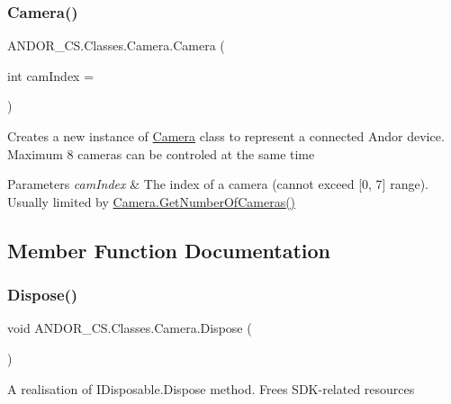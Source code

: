 \subsubsection{\texorpdfstring{Camera()}{Camera()}}
{\footnotesize\ttfamily A\+N\+D\+O\+R\+\_\+\+C\+S.\+Classes.\+Camera.\+Camera (\begin{DoxyParamCaption}\item[{int}]{cam\+Index = {} }\end{DoxyParamCaption})}



Creates a new instance of \hyperlink{class_a_n_d_o_r___c_s_1_1_classes_1_1_camera}{Camera} class to represent a connected Andor device. Maximum 8 cameras can be controled at the same time 


\begin{DoxyParams}{Parameters}
{\em cam\+Index} & The index of a camera (cannot exceed \mbox{[}0, 7\mbox{]} range). Usually limited by \hyperlink{class_a_n_d_o_r___c_s_1_1_classes_1_1_camera_aad5087de881575f5184615caf1fad61a}{Camera.\+Get\+Number\+Of\+Cameras()}\\
\hline
\end{DoxyParams}


\subsection{Member Function Documentation}
\mbox{\label{class_a_n_d_o_r___c_s_1_1_classes_1_1_camera_a0a6c90ea995444043ce9bd37b9fad334}} 
\subsubsection{\texorpdfstring{Dispose()}{Dispose()}}
{\footnotesize\ttfamily void A\+N\+D\+O\+R\+\_\+\+C\+S.\+Classes.\+Camera.\+Dispose (\begin{DoxyParamCaption}{ }\end{DoxyParamCaption})}



A realisation of I\+Disposable.\+Dispose method. Frees S\+D\+K-\/related resources 

\mbox{\label{class_a_n_d_o_r___c_s_1_1_classes_1_1_camera_a678cf1352506a482a68e9285b2f589ec}} 
